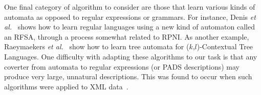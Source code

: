 

One final category of algorithm to consider 
are those that learn various kinds of
automata as opposed to regular expressions or grammars.
For instance, Denis {\em et al.}~\cite{denis:learning-regular-language}
shows how to learn regular languages using a new kind of automaton
called an RFSA, through a process somewhat related to RPNI.  As another
example,
Raeymaekers {\em et al.}~\cite{raeymaekers+:learning-tree-languages,raeymaekers+:wrapper-induction} show how to learn tree automata for
($k$,$l$)-Contextual Tree Languages.
One difficulty with adapting these algorithms to our task is that 
any coverter from automata to regular expressions (or PADS descriptions)
may produce very large, unnatural descriptions.  This was found to occur 
when such algorithms were applied to XML data~\cite{bex+:dtd-inference}.


  

